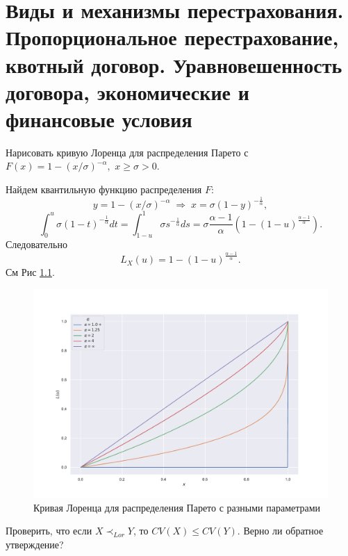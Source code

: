 \chapter{Виды и механизмы перестрахования. Пропорциональное перестрахование, квотный договор. Уравновешенность договора, экономические и финансовые условия}
\problem{}
Нарисовать кривую Лоренца для распределения Парето с $F(x) = 1 - (x/\sigma)^{-\alpha},$ $x \geq \sigma > 0$.
\solution{}

    Найдем квантильную функцию распределения $F$:
    \begin{equation}
        y = 1 - (x/\sigma)^{-\alpha}  \; \Rightarrow \; x = \sigma(1 - y)^{-\frac{1}{\alpha}},
    \end{equation}
    \begin{equation}
        \int_0^u \sigma(1-t)^{-\frac{1}{\alpha}}dt = \int_{1-u}^1 \sigma s^{-\frac{1}{\alpha}}ds = \sigma \frac{\alpha - 1}{\alpha}\left(1 - (1 - u)^{\frac{\alpha - 1 }{\alpha}}\right).
    \end{equation}
    Следовательно 
    \begin{equation}
        L_X(u) = 1 - (1 - u)^{\frac{\alpha- 1}{\alpha}}.
    \end{equation}
    См Рис \ref{fig:hw8t1p1}.

    \begin{figure}[htbp]
        \centering
        \includegraphics[width=\linewidth]{pics/hw8t1p1.pdf}
        \caption{Кривая Лоренца для распределения Парето с разными параметрами}
        \label{fig:hw8t1p1}
    \end{figure}

\problem{}
Проверить, что если $X \prec_{Lor} Y$, то $CV(X) \leq CV(Y)$. Верно ли обратное утверждение?
\solution{}

